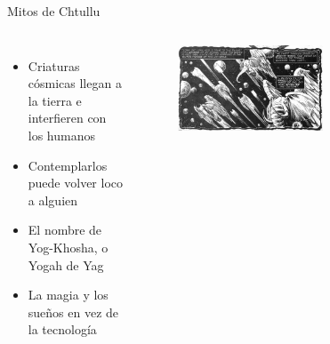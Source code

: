 \begin{frame}{Mitos de Chtullu}
\begin{columns}
 \begin{itemize}
    \item Criaturas cósmicas llegan a la tierra e interfieren con los humanos
    \item Contemplarlos puede volver loco a alguien
    \item El nombre de Yog-Khosha, o Yogah de Yag
    \item La magia y los sueños en vez de la tecnología
 \end{itemize}
    \begin{figure}[htb]
      \centering
      \includegraphics[width=0.6\textwidth]{img/tropes/mitos}
    \end{figure}
  \end{columns}
\end{frame}

